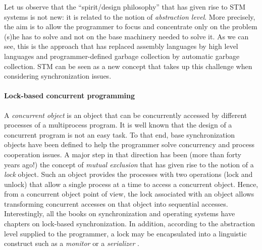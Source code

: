Let us observe that  the ``spirit/design philosophy'' that has given 
rise to  STM systems is not new: it is related to the notion of 
{\it abstraction level}.   
More precisely,  the  aim  is   to allow  the programmer  to  focus and
concentrate only  on the problem  (s)he has to
solve and not on the base machinery needed to solve it. 
As we can see, this is the approach  that  has   replaced assembly languages  
by  high level languages and programmer-defined garbage collection 
by automatic garbage collection.   STM can  be seen as a  new concept
that takes  up  this challenge when considering synchronization issues. 





















\paragraph{Lock-based concurrent programming}
A   {\it concurrent  object} is  an   object that can be   concurrently  
accessed by different processes of a  multiprocess program. 
%
It is well known  that the design of a concurrent program is not an easy
task. To that end, base synchronization objects have been defined to help 
the programmer solve  concurrency and process cooperation  issues. 
A  major step in that direction has been 
(more than forty years  ago!) the concept of {\it mutual exclusion} \cite{D68}
that has given rise  to  the  notion of  a  {\it  lock} object.    Such an
object provides the processes with two operations (lock and unlock)
that  allow a single process at a time to access a concurrent object. 
Hence, from a  concurrent object point of view,   the  lock associated with
an object allows transforming  concurrent  accesses on  that object  
into sequential accesses.  Interestingly, all the books on synchronization 
and operating systems  have chapters on lock-based
synchronization. In addition, according to the abstraction level
supplied to the programmer,  a lock may be encapsulated into a linguistic 
construct such as a {\it monitor} \cite{H74} or a {\it serializer} \cite{HA79}.



